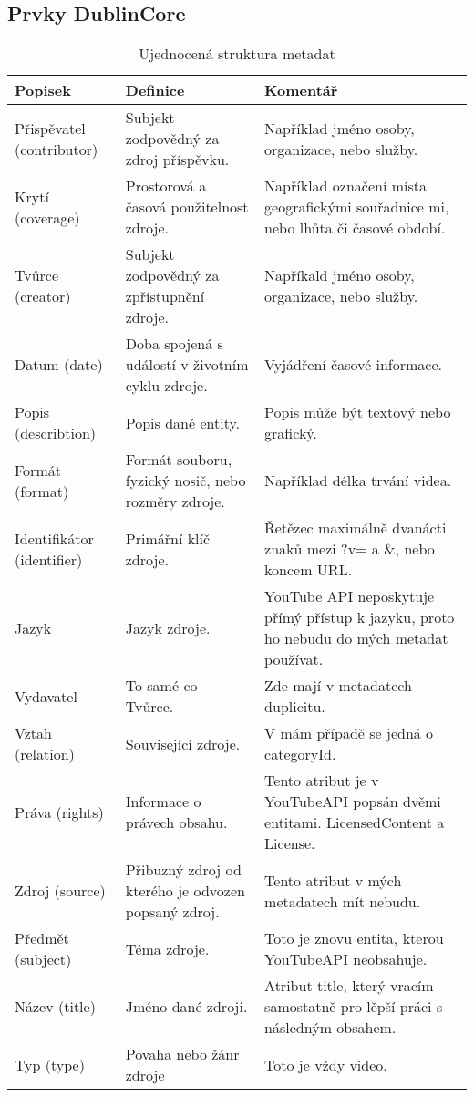 \subsection{Prvky DublinCore}
\begin{table}[h!]
\caption[DublinCore metadata]{Ujednocená struktura metadat}\label{tab:dublincore1}
\begin{tabular}{|p{} | p{} | p{}|}
\hline
Popisek & Definice & Komentář\\
\hline
Přispěvatel (contributor) & Subjekt zodpovědný za zdroj příspěvku. & Například jméno osoby, organizace, nebo služby.\\
\hline
Krytí (coverage) & Prostorová a časová použitelnost zdroje. & Například označení místa geografickými souřadnice mi, nebo lhůta či časové období.\\
\hline
Tvůrce (creator) & Subjekt zodpovědný za zpřístupnění zdroje. & Napříkald jméno osoby, organizace, nebo služby.\\
\hline
Datum (date) & Doba spojená s událostí v životním cyklu zdroje. & Vyjádření časové informace. \\
\hline
Popis (describtion) & Popis dané entity. & Popis může být textový nebo grafický. \\
\hline
Formát (format) & Formát souboru, fyzický nosič, nebo rozměry zdroje. & Například délka trvání videa. \\
\hline
Identifikátor (identifier) & Primářní klíč zdroje. & Řetězec maximálně dvanácti znaků mezi ?v= a \&, nebo koncem URL.\\
\hline
Jazyk & Jazyk zdroje. & YouTube API neposkytuje přímý přístup k jazyku, proto ho nebudu do mých metadat používat.\\
\hline
Vydavatel & To samé co Tvůrce. & Zde mají v metadatech duplicitu. \\
\hline
Vztah (relation) & Související zdroje. & V mám případě se jedná o categoryId. \\
\hline
Práva (rights) & Informace o právech obsahu. & Tento atribut je v YouTubeAPI popsán dvěmi entitami. LicensedContent a License.\\
\hline
Zdroj (source) & Přibuzný zdroj od kterého je odvozen popsaný zdroj. & Tento atribut v mých metadatech mít nebudu.\\
\hline
Předmět (subject) & Téma zdroje. & Toto je znovu entita, kterou YouTubeAPI neobsahuje.\\
\hline
Název (title) & Jméno dané zdroji. & Atribut title, který vracím samostatně pro lěpší práci s následným obsahem.\\
\hline
Typ (type) & Povaha nebo žánr zdroje & Toto je vždy video.\\
\hline
\end{tabular}
\end{table}